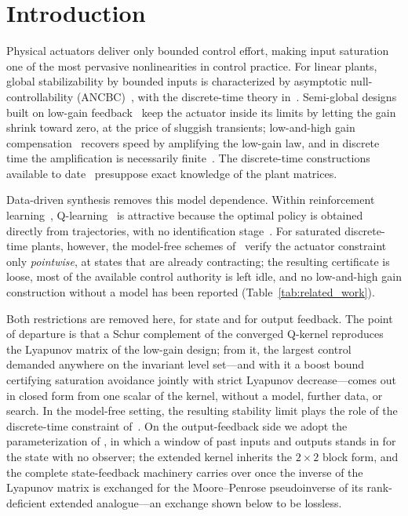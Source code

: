 \documentclass[final,5p,times,authoryear]{elsarticle}
\theoremstyle{plain}
\theoremstyle{definition}
\theoremstyle{remark}
\begin{document}
\section{Introduction}\label{sec:intro}

Physical actuators deliver only bounded control effort, making input
saturation one of the most pervasive nonlinearities in control
practice.  For linear plants, global stabilizability by bounded inputs
is characterized by asymptotic null-controllability
(ANCBC)~\citep{SussmannSontagYang1994}, with the discrete-time theory
in~\citep{YangSontagSussmann1997}.  Semi-global designs built on
low-gain feedback~\citep{LinSaberi1993,Lin1998} keep the actuator
inside its limits by letting the gain shrink toward zero, at the price
of sluggish transients; low-and-high gain
compensation~\citep{LinSaberi1995,HuLin2001} recovers speed by
amplifying the low-gain law, and in discrete time the amplification is
necessarily
finite~\citep{LinSaberiStoorvogelMantri2000,WangGripSaberiJohansen2012}.
The discrete-time constructions available to
date~\citep{LinSaberiStoorvogelMantri2000} presuppose exact knowledge
of the plant matrices.

Data-driven synthesis removes this model dependence.  Within
reinforcement learning~\citep{SuttonBarto2018,Bertsekas2019},
Q-learning~\citep{WatkinsDayan1992} is attractive because the optimal
policy is obtained directly from trajectories, with no identification
stage~\citep{LewisVrabieVamvoudakis2012,JiangJiang2012,Kleinman1968}.
For saturated discrete-time plants, however, the model-free schemes
of~\citep{RizviLin2018CDC,RizviLin2019IJRNC,RizviLin2023book} verify
the actuator constraint only \emph{pointwise}, at states that are
already contracting; the resulting certificate is loose, most of the
available control authority is left idle, and no low-and-high gain
construction without a model has been reported
(Table~\ref{tab:related_work}).



Both restrictions are removed here, for state and for output
feedback.  The point of departure is that a Schur complement of the
converged Q-kernel reproduces the Lyapunov matrix of the low-gain
design; from it, the largest control demanded anywhere on the
invariant level set---and with it a boost bound certifying saturation
avoidance jointly with strict Lyapunov decrease---comes out in closed
form from one scalar of the kernel, without a model, further data, or
search.  In the model-free setting, the resulting stability limit
plays the role of the discrete-time constraint
of~\citep{WangSaberiStoorvogelSannuti2012}.  On the output-feedback
side we adopt the parameterization of \citet{RizviLin2023book}, in
which a window of past inputs and outputs stands in for the state with
no observer; the extended kernel inherits the $2\times2$ block form,
and the complete state-feedback machinery carries over once the
inverse of the Lyapunov matrix is exchanged for the Moore--Penrose
pseudoinverse of its rank-deficient extended analogue---an exchange
shown below to be lossless.
\end{document}
